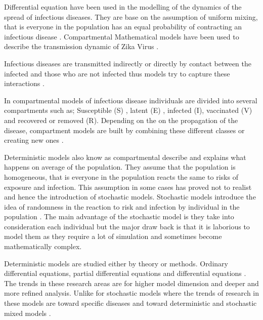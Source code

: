Differential equation have been used in the modelling of the dynamics of the spread of infectious diseases. They are base on the assumption of uniform mixing, that is everyone in the population has an equal probability of contracting an infectious disease \citep{kaplan2002emergency}.
Compartmental Mathematical models have been used to describe the transmission dynamic of Zika Virus \citep{gao2016}.


 Infectious diseases are transmitted indirectly  or directly by contact between the infected and those who are not infected thus models try to capture these interactions \citep{sat}. 
 
In compartmental models of infectious disease individuals are divided into  several compartments such as; Susceptible (S) , latent (E) , infected (I), vaccinated (V) and recovered or removed (R). Depending on the on the propagation of the disease, compartment models are built by combining these different classes or creating new ones \citep{li}.

 
Deterministic models also know as compartmental describe and explains what happens on average of the population. They assume that the population is homogeneous, that is everyone in the population reacts the same to risks of exposure and infection. This assumption in some cases has proved not to realist
and hence the introduction of stochastic models.  Stochastic models introduce the idea of randomness in the reaction to risk and infection by individual in the population \citep{ming2016stochastic}. The main advantage of the stochastic model is they take into consideration each individual but the major draw back is that it is laborious to model them as they require a lot of simulation and sometimes become mathematically complex.
 
Deterministic models are studied either by theory or methods.
Ordinary differential equations, partial differential equations and differential equations \citep{keeling2008modeling}.
The trends in these research areas are for higher model dimension and deeper and more refined analysis. Unlike for stochastic models where the trends of research in these models are
toward specific diseases and toward deterministic and stochastic mixed models \citep{fu2013propagation}.


